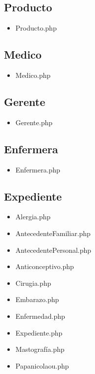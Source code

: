 		\subsection{Producto}
		\begin{itemize}
			\item Producto.php
		\end{itemize}				
		
		\subsection{Medico}
		\begin{itemize}
			\item Medico.php
		\end{itemize}				
		
		\subsection{Gerente}
		\begin{itemize}
			\item Gerente.php
		\end{itemize}				
		
		\subsection{Enfermera}
		\begin{itemize}
			\item Enfermera.php
		\end{itemize}				
		
		\subsection{Expediente}
		\begin{itemize}
			\item Alergia.php
			\item AntecedenteFamiliar.php
			\item AntecedentePersonal.php
			\item Anticonceptivo.php
			\item Cirugia.php
			\item Embarazo.php
			\item Enfermedad.php
			\item Expediente.php
			\item Mastografía.php
			\item Papanicolaou.php
		\end{itemize}				
		
